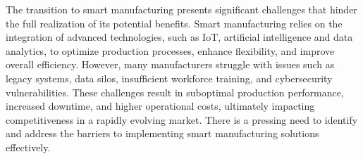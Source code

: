 The transition to smart manufacturing presents significant challenges that hinder the full realization of its potential benefits. Smart manufacturing relies on the integration of advanced technologies, such as IoT, artificial intelligence and data analytics, to optimize production processes, enhance flexibility, and improve overall efficiency. However, many manufacturers struggle with issues such as legacy systems, data silos, insufficient workforce training, and cybersecurity vulnerabilities. These challenges result in suboptimal production performance, increased downtime, and higher operational costs, ultimately impacting competitiveness in a rapidly evolving market. There is a pressing need to identify and address the barriers to implementing smart manufacturing solutions effectively.